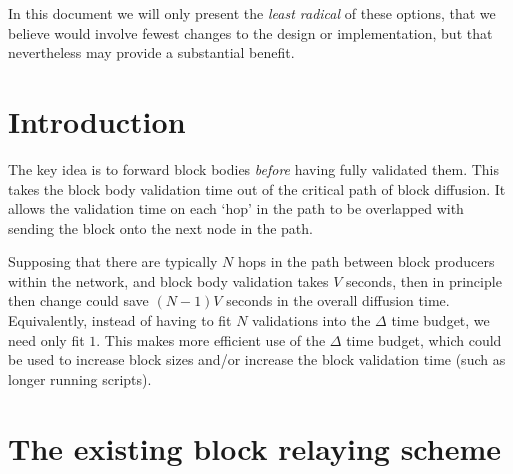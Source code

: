 \documentclass[11pt,a4paper]{article}
\begin{document}
In this document we will only present the \emph{least radical} of these options,
that we believe would involve fewest changes to the design or implementation,
but that nevertheless may provide a substantial benefit.

\section{Introduction}

The key idea is to forward block bodies \emph{before} having fully validated
them. This takes the block body validation time out of the critical path of
block diffusion. It allows the validation time on each `hop' in the path to be
overlapped with sending the block onto the next node in the path.

Supposing that there are typically $N$ hops in the path between block producers
within the network, and block body validation takes $V$ seconds, then in
principle then change could save $(N-1) V$ seconds in the overall diffusion
time. Equivalently, instead of having to fit $N$ validations into the $\Delta$
time budget, we need only fit $1$. This makes more efficient use of the
$\Delta$ time budget, which could be used to increase block sizes and/or
increase the block validation time (such as longer running scripts).

\section{The existing block relaying scheme}
\end{document}
